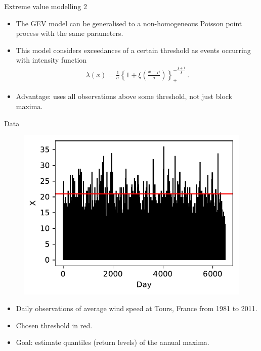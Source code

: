 \documentclass[10pt]{beamer}
\begin{document}
%
\begin{frame}{Extreme value modelling 2}{}
%
\begin{itemize}
	\item The GEV model can be generalised to a
		non-homogeneous Poisson point process
		with the same parameters.
	\item This model considers exceedances of a certain threshold as events
		occurring with intensity function
		\begin{align*}
			\lambda(x) =
			\frac{1}{\sigma}
				\left\{1 + \xi \left(\frac{x - \mu}{\sigma}\right)\right\}_+
				^ {-\frac{\xi + 1}{\xi}} \,.
		\end{align*}
	\item Advantage: uses all observations above some threshold,
		not just block maxima.
\end{itemize}
%
\end{frame}
%
%
\begin{frame}{Data}{}
%
\begin{figure}
	\centering
	\includegraphics[width=0.5\linewidth]{plots/data.pdf}
\end{figure}
%
\begin{itemize}
	\item Daily observations of average wind speed
		at Tours, France from 1981 to 2011.
	\item Chosen threshold in red.
	\item Goal: estimate quantiles (return levels) of the annual maxima.
\end{itemize}
%
\end{frame}
%
%
\end{document}
